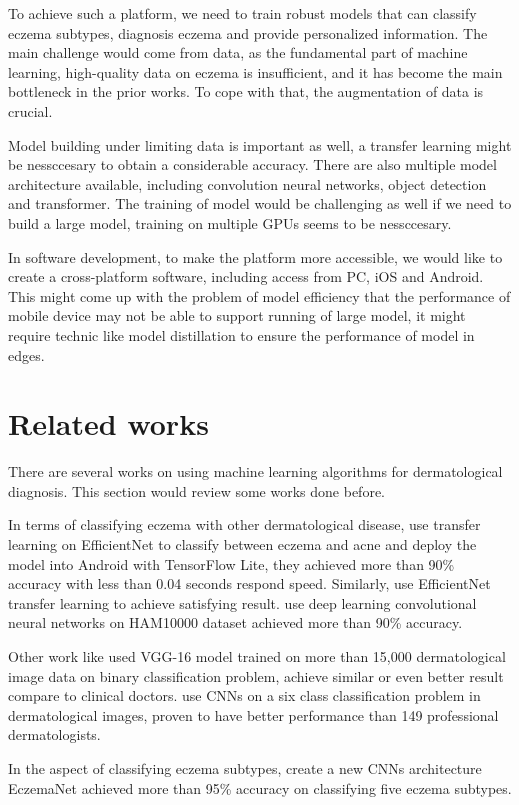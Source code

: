 To achieve such a platform, we need to train robust models that can classify eczema subtypes, diagnosis eczema and provide personalized information. The main challenge would come from data, as the fundamental part of machine learning, high-quality data on eczema is insufficient, and it has become the main bottleneck in the prior works\cite{huang2024remote}. To cope with that, the augmentation of data is crucial.

Model building under limiting data is important as well, a transfer learning might be nessccesary to obtain a considerable accuracy. There are also multiple model architecture available, including convolution neural networks, object detection and transformer. The training of model would be challenging as well if we need to build a large model, training on multiple GPUs seems to be nessccesary.

In software development, to make the platform more accessible, we would like to create a cross-platform software, including access from PC, iOS and Android. This might come up with the problem of model efficiency that the performance of mobile device may not be able to support running of large model, it might require technic like model distillation to ensure the performance of model in edges.

\section{Related works}

There are several works on using machine learning algorithms for dermatological diagnosis. This section would review some works done before.

In terms of classifying eczema with other dermatological disease, \cite{juwairi2023efficientnet} use transfer learning on EfficientNet to classify between eczema and acne and deploy the model into Android with TensorFlow Lite, they achieved more than 90\% accuracy with less than 0.04 seconds respond speed. Similarly, \cite{pathriclassification} use EfficientNet transfer learning to achieve satisfying result. \cite{mehboob2025deep} use deep learning convolutional neural networks on HAM10000 dataset achieved more than 90\% accuracy.

Other work like \cite{thomsen2020deep} used VGG-16 model trained on more than 15,000 dermatological image data on binary classification problem, achieve similar or even better result compare to clinical doctors. \cite{zhou2017multi} use CNNs on a six class classification problem in dermatological images, proven to have better performance than 149 professional dermatologists.

In the aspect of classifying eczema subtypes, \cite{junayed2020eczemanet} create a new CNNs architecture EczemaNet achieved more than 95\% accuracy on classifying five eczema subtypes. 